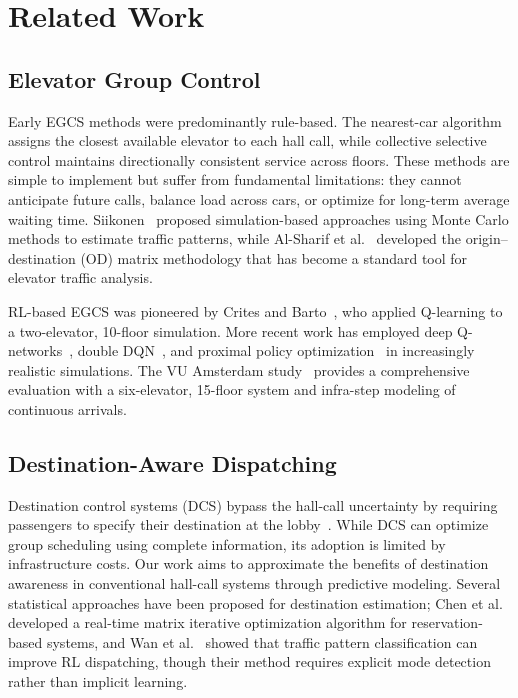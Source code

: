\documentclass{ieeeaccess}
\begin{document}
\section{Related Work}
\label{sec:related}

\subsection{Elevator Group Control}

Early EGCS methods were predominantly rule-based. The nearest-car
algorithm~\cite{barney2003elevator} assigns the closest available
elevator to each hall call, while collective selective control
maintains directionally consistent service across floors. These
methods are simple to implement but suffer from fundamental
limitations: they cannot anticipate future calls, balance load
across cars, or optimize for long-term average waiting time.
Siikonen~\cite{siikonen1997elevator} proposed simulation-based
approaches using Monte Carlo methods to estimate traffic patterns,
while Al-Sharif et al.~\cite{alsharif2020traffic} developed the
origin--destination (OD) matrix methodology that has become a
standard tool for elevator traffic analysis.

RL-based EGCS was pioneered by Crites and Barto~\cite{crites1998elevator},
who applied Q-learning to a two-elevator, 10-floor simulation. More
recent work has employed deep Q-networks~\cite{mnih2015dqn},
double DQN~\cite{van2016deep}, and proximal policy
optimization~\cite{schulman2017ppo} in increasingly realistic
simulations. The VU Amsterdam study~\cite{vu2025rl} provides a
comprehensive evaluation with a six-elevator, 15-floor system and
infra-step modeling of continuous arrivals.

\subsection{Destination-Aware Dispatching}

Destination control systems (DCS) bypass the hall-call uncertainty by
requiring passengers to specify their destination at the
lobby~\cite{sorsa2022destination}. While DCS can optimize group
scheduling using complete information, its adoption is limited by
infrastructure costs. Our work aims to approximate the benefits of
destination awareness in conventional hall-call systems through
predictive modeling. Several statistical approaches have been
proposed for destination estimation; Chen et al.~\cite{chen2021matrix}
developed a real-time matrix iterative optimization algorithm for
reservation-based systems, and Wan et al.~\cite{wan2024traffic}
showed that traffic pattern classification can improve RL
dispatching, though their method requires explicit mode detection
rather than implicit learning.
\end{document}
